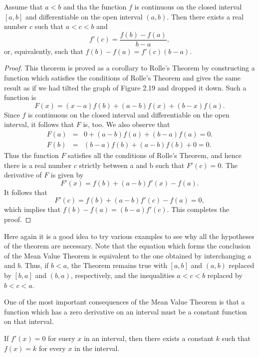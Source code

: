 \begin{thm} 
\label{thm 2.5.2}
Assume that $a < b$ and tha the function $f$ is continuous on the
closed interval $[a, b]$ and differentiable on the open interval $(a, b)$. Then there exists a real number $c$ such that $a < c < b$ and
$$
f'(c)= \frac{f(b) - f(a)}{b - a},
$$
\noindent or, equivalently, such that $f(b) - f(a) = f' (c)(b - a)$.
\end{thm}

\begin{proof}
This theorem is proved as a corollary to Rolle's Theorem by constructing a function which satisfies the conditions of Rolle's Theorem and gives the same result as if we had tilted the graph of Figure \f{2.19} and dropped it down. Such a function is
$$
F(x) = (x - a)f(b) + (a - b)f(x) + (b - x)f(a).
$$
Since $f$ is continuous on the closed interval and differentiable on the open interval, it follows that $F$ is, too. We also observe that
\begin{eqnarray*}
F(a) &=& 0 + (a - b)f(a) + (b - a)f(a) = 0.\\
F(b) &=& (b - a)f(b) + (a - b)f(b) + 0 = 0.
\end{eqnarray*}
Thus the function $F$ satisfies all the conditions of Rolle's Theorem, and hence there is a real number $c$ strictly between a and b such that $F'(c) = 0$. The derivative of $F$ is given by
$$
F'(x) = f(b) + (a - b) f'(x) - f(a).
$$
It follows that
$$
F'(c) = f(b) + (a - b)f'(c) - f(a) = 0,
$$
which implies that $f(b) - f(a) = (b - a) f'(c)$. This completes the proof.
\end{proof}

Here again it is a good idea to try various examples to see why all the hypotheses of the theorem are necessary. Note that the equation which forms the conclusion of the Mean Value Theorem is equivalent to the one obtained by interchanging $a$ and $b$. Thus, if $b < a$, the Theorem remains true with $[a, b]$ and $(a, b)$ replaced by $[b, a]$ and $(b, a)$, respectively, and the inequalities $a < c < b$ replaced by $b < c < a$.

One of the most important consequences of the Mean Value Theorem is that a function which has a zero derivative on an interval must be a constant function on that interval.
\begin{prop}
\label{thm 2.5.3}
If $f'(x) = 0$ for euery $x$ in an interval, then there exists a constant $k$ such that $f(x) = k$ for every $x$ in the interval.
\end{prop}

